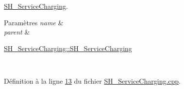 \hyperlink{classSH__ServiceCharging}{S\-H\-\_\-\-Service\-Charging}. 


\begin{DoxyParams}{Paramètres}
{\em name} & \\
\hline
{\em parent} & 
\begin{DoxyItemize}
\item \hyperlink{classSH__ServiceCharging_afa5273d046049b1c2b020a6a19a8290b}{S\-H\-\_\-\-Service\-Charging\-::\-S\-H\-\_\-\-Service\-Charging} 
\end{DoxyItemize}\\
\hline
\end{DoxyParams}


Définition à la ligne \hyperlink{SH__ServiceCharging_8cpp_source_l00013}{13} du fichier \hyperlink{SH__ServiceCharging_8cpp_source}{S\-H\-\_\-\-Service\-Charging.\-cpp}.



